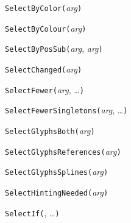 \texttt{SelectByColor(}\textit{arg}\texttt{)}



\texttt{SelectByColour(}\textit{arg}\texttt{)}



\texttt{SelectByPosSub(}\textit{arg}, \textit{arg}\texttt{)}



\texttt{SelectChanged(}\textit{arg}\texttt{)}



\texttt{SelectFewer(}\textit{arg}, \ldots\texttt{)}



\texttt{SelectFewerSingletons(}\textit{arg}, \ldots\texttt{)}



\texttt{SelectGlyphsBoth(}\textit{arg}\texttt{)}



\texttt{SelectGlyphsReferences(}\textit{arg}\texttt{)}



\texttt{SelectGlyphsSplines(}\textit{arg}\texttt{)}



\texttt{SelectHintingNeeded(}\textit{arg}\texttt{)}



\texttt{SelectIf(}, \ldots\texttt{)}




